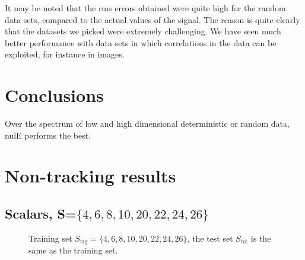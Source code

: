 It may be noted that the rms errors obtained were quite high for the random data sets, compared to the actual values of the signal.  The reason is quite clearly that the datasets we picked were extremely challenging.  We have seen much better performance with data sets in which correlations in the data can be exploited, for instance in images.

\section{Conclusions}
Over the spectrum of low and high dimensional deterministic or random data, nulE performs the best.



%

\newpage
\appendix
\section{Non-tracking results}

\clearpage
\newpage
\subsection{Scalars, S=$\{4, 6, 8, 10, 20, 22, 24, 26\}$}
								\begin{figure}[h]
								\centering
								\subtable{\begin{tiny}\end{tiny}}
								\caption{Training set $S_{\textrm{trg}}=\{4, 6, 8, 10, 20, 22, 24, 26\}$, the test set $S_{\textrm{tst}}$ is the same as the training set.}
								\label{fig:aRVQ_4_6_8_10_20_22_24_26}
								\end{figure}
\clearpage
\newpage
